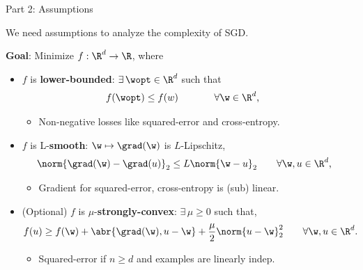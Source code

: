 \documentclass[mathserif,notheorems, hyperref={colorlinks, citecolor=blue, urlcolor=blue, linkcolor=blue}]{beamer}
\begin{document}

    \begin{frame}{Part 2: Assumptions}
        \begin{center}
            We need assumptions to analyze the complexity of SGD. 
        \end{center}
       
        \vspace{1.5ex}

        \textbf{Goal}: Minimize \( f : \R^d \rightarrow \R \), where
        \vspace{0.5ex}
        \pause
        \begin{itemize}
            \item \( f \) is \textbf{lower-bounded}: \( \exists \, \wopt \in \R^d \) such that
                \begin{align*}
                    f(\wopt) &\leq f(w) \hspace{1.7em} \tag*{\(\forall \w \in \R^d \), } 
                \end{align*}
                \vspace{-2ex}
                \begin{itemize}
                    \item Non-negative losses like squared-error and cross-entropy. 
                \end{itemize}
                \vspace{1ex}
                \pause 
            \item \( f \) is L-\textbf{smooth}: \( \w \mapsto \grad(\w) \) is \( L \)-Lipschitz, 
                \begin{align*}
                    \norm{\grad(\w) - \grad(u)}_2 &\leq L \norm{\w - u}_2 \tag*{\(\forall \w, u \in \R^d \),} 
                \end{align*}
                \vspace{-2ex}
                \begin{itemize}
                    \item Gradient for squared-error, cross-entropy is (sub) linear. 
                \end{itemize}
                \vspace{1ex}
                \pause
            \item (Optional) \( f \) is \( \mu \)-\textbf{strongly-convex}: \( \exists \, \mu \geq 0 \) such that, 
                \begin{align*}
                   f(u) \geq f(\w) + \abr{\grad(\w), u - \w} + \frac{\mu}{2} \norm{u - \w}^2_2 \tag*{\( \forall \w, u \in \R^d \).}
                \end{align*}
                \vspace{-2ex}
                \begin{itemize}
                    \item Squared-error if \( n \geq d \) and examples are linearly indep. 
                \end{itemize}
        \end{itemize}
     
    \end{frame}
\end{document}
